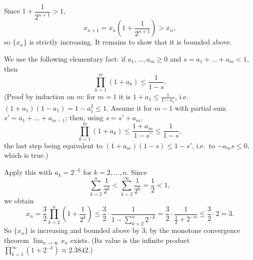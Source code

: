 \documentclass[11pt,a4paper]{article}
\newenvironment{solution}[1]{%
  \par\addvspace{1.7ex}%
  \noindent{\color{solutioncolor}\textbf{#1}}\hspace{0.55em}\ignorespaces}%
  {\par\addvspace{0.9ex}}
\begin{document}
\begin{solution}{Solution 2.3.11}\label{xs:2.3.11}
Since $1+\dfrac{1}{2^{n+1}}>1$,
\[
x_{n+1}=x_n\left(1+\frac{1}{2^{n+1}}\right)>x_n ,
\]
so $\{x_n\}$ is strictly increasing. It remains to show that it is bounded above.

We use the following elementary fact: if $a_1,\dots,a_m\ge0$ and $s=a_1+\dots+a_m<1$, then
\[
\prod_{k=1}^{m}(1+a_k)\le\frac{1}{1-s}.
\]
(Proof by induction on $m$: for $m=1$ it is $1+a_1\le\frac{1}{1-a_1}$, i.e.\ $(1+a_1)(1-a_1)=1-a_1^2\le1$. Assume it for $m-1$ with partial sum $s'=a_1+\dots+a_{m-1}$; then, using $s=s'+a_m$,
\[
\prod_{k=1}^{m}(1+a_k)\le\frac{1+a_m}{1-s'}
\le\frac{1}{1-s},
\]
the last step being equivalent to $(1+a_m)(1-s)\le 1-s'$, i.e.\ to $-a_ms\le0$, which is true.)

Apply this with $a_k=2^{-k}$ for $k=2,\dots,n$. Since
\[
\sum_{k=2}^{n}\frac{1}{2^k}<\sum_{k=2}^{\infty}\frac{1}{2^k}=\frac12<1,
\]
we obtain
\[
x_n=\frac32\prod_{k=2}^{n}\left(1+\frac{1}{2^k}\right)
\le\frac32\cdot\frac{1}{1-\sum_{k=2}^{n}2^{-k}}
=\frac32\cdot\frac{1}{\frac12+2^{-n}}\le\frac32\cdot 2=3 .
\]
So $\{x_n\}$ is increasing and bounded above by $3$; by the monotone convergence theorem $\displaystyle\lim_{n\to\infty}x_n$ exists. (Its value is the infinite product $\prod_{k=1}^{\infty}\left(1+2^{-k}\right)\approx2.3842$.)
\end{solution}
\end{document}
